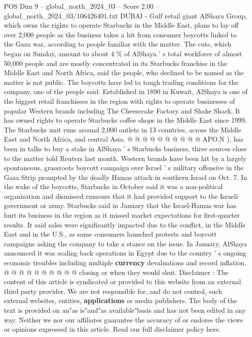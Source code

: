 \begin{textsample}{POS Dim 9 – global\_north\_2024\_03 – Score 2.00 – global\_north\_2024\_03/106426401.txt}  \label{ex:f9_pos_196}
DUBAI - Gulf retail giant AlShaya Group, which owns the rights to operate Starbucks in the Middle East, plans to lay off over 2,000 people as the business takes a hit from consumer boycotts linked to the Gaza war, according to people familiar with the matter.
The cuts, which began on Sunday, amount to about 4 \% of AlShaya ' s total workforce of almost 50,000 people and are mostly concentrated in its Starbucks franchise in the Middle East and North Africa, said the people, who declined to be named as the matter is not public.
The boycotts have led to tough trading conditions for the company, one of the people said.
Established in 1890 in Kuwait, AlShaya is one of the biggest retail franchisees in the region with rights to operate businesses of popular Western brands including The Cheesecake Factory and Shake Shack.
It has owned rights to operate Starbucks coffee shops in the Middle East since 1999.
The Starbucks unit runs around 2,000 outlets in 13 countries, across the Middle East and North Africa, and central Asia. @ @ @ @ @ @ @ @ @ @ APO.N ), has been in talks to buy a stake in AlShaya ' s Starbucks business, three sources close to the matter told Reuters last month.
Western brands have been hit by a largely spontaneous, grassroots boycott campaign over Israel ' s military offensive in the Gaza Strip prompted by the deadly Hamas attack in southern Israel on Oct. 7.
In the wake of the boycotts, Starbucks in October said it was a non-political organisation and dismissed rumours that it had provided support to the Israeli government or army.
Starbucks said in January that the Israel-Hamas war has hurt its business in the region as it missed market expectations for first-quarter results.
It said sales were significantly impacted due to the conflict, in the Middle East and in the U.S., as some consumers launched protests and boycott campaigns asking the company to take a stance on the issue.
In January, AlShaya announced it was scaling back operations in Egypt due to the country ' s ongoing economic troubles including multiple \textbf{currency} devaluations and record inflation. @ @ @ @ @ @ @ @ @ @ closing or when they would shut.
Disclaimer : The content of this article is syndicated or provided to this website from an external third party provider.
We are not responsible for, and do not control, such external websites, entities, \textbf{applications} or media publishers.
The body of the text is provided on an"as is"and"as available"basis and has not been edited in any way.
Neither we nor our affiliates guarantee the accuracy of or endorse the views or opinions expressed in this article.
Read our full disclaimer policy here.

\end{textsample}
